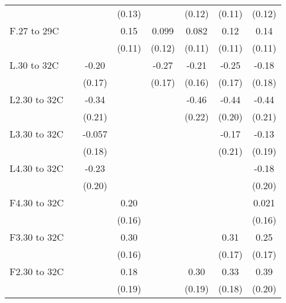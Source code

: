 \documentclass[paper=letterpaper, fontsize=11pt]{article} %
\begin{document}
{\begin{landscape}
\begin{longtable}{l*{7}{c}}
                    &            &            &      (0.13)&            &      (0.12)&      (0.11)&      (0.12)\\
F.27 to 29C         &            &            &        0.15&       0.099&       0.082&        0.12&        0.14\\
                    &            &            &      (0.11)&      (0.12)&      (0.11)&      (0.11)&      (0.11)\\
L.30 to 32C         &            &       -0.20&            &       -0.27&       -0.21&       -0.25&       -0.18\\
                    &            &      (0.17)&            &      (0.17)&      (0.16)&      (0.17)&      (0.18)\\
L2.30 to 32C        &            &       -0.34&            &            &       -0.46&       -0.44&       -0.44\\
                    &            &      (0.21)&            &            &      (0.22)&      (0.20)&      (0.21)\\
L3.30 to 32C        &            &      -0.057&            &            &            &       -0.17&       -0.13\\
                    &            &      (0.18)&            &            &            &      (0.21)&      (0.19)\\
L4.30 to 32C        &            &       -0.23&            &            &            &            &       -0.18\\
                    &            &      (0.20)&            &            &            &            &      (0.20)\\
F4.30 to 32C        &            &            &        0.20&            &            &            &       0.021\\
                    &            &            &      (0.16)&            &            &            &      (0.16)\\
F3.30 to 32C        &            &            &        0.30&            &            &        0.31&        0.25\\
                    &            &            &      (0.16)&            &            &      (0.17)&      (0.17)\\
F2.30 to 32C        &            &            &        0.18&            &        0.30&        0.33&        0.39\\
                    &            &            &      (0.19)&            &      (0.19)&      (0.18)&      (0.20)\\

\end{longtable}
\end{landscape}}
\end{document}
